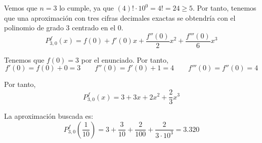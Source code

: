 \documentclass[12pt]{article}
\begin{document}
\begin{ejercicio}
Vemos que $n=3$ lo cumple, ya que $(4)!\cdot 10^0 = 4!=24\geq 5$. Por tanto, tenemos que una aproximación con tres cifras decimales exactas se obtendría con el polinomio de grado 3 centrado en el 0.
\begin{equation*}
    P_{3,0}^f(x)=f(0)+f'(0)x + \frac{f''(0)}{2}x^2 +\frac{f'''(0)}{6}x^3
\end{equation*}

Tenemos que $f(0)=3$ por el enunciado. Por tanto,
\begin{equation*}
    f'(0)=f(0)+0=3
    \qquad
    f''(0)=f'(0)+1=4
    \qquad
    f'''(0)=f''(0)=4
\end{equation*}

Por tanto,
\begin{equation*}
    P_{3,0}^f(x)=3+3x + 2x^2 +\frac{2}{3}x^3
\end{equation*}

La aproximación buscada es:
\begin{equation*}
    P_{3,0}^f \left(\frac{1}{10}\right) = 3+\frac{3}{10} + \frac{2}{100} + \frac{2}{3\cdot 10^3}=3.320
\end{equation*}
    
\end{ejercicio}
\end{document}
